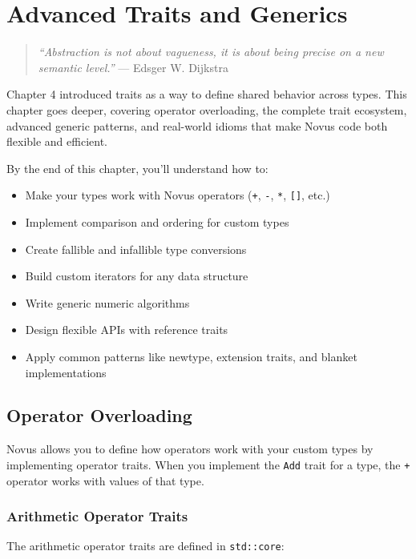 \chapter{Advanced Traits and Generics}
\label{ch:traits-generics}

\begin{quote}
\textit{``Abstraction is not about vagueness, it is about being precise on a new semantic level.''} --- Edsger W. Dijkstra
\end{quote}

Chapter 4 introduced traits as a way to define shared behavior across types. This chapter goes deeper, covering operator overloading, the complete trait ecosystem, advanced generic patterns, and real-world idioms that make Novus code both flexible and efficient.

By the end of this chapter, you'll understand how to:
\begin{itemize}
    \item Make your types work with Novus operators (\texttt{+}, \texttt{-}, \texttt{*}, \texttt{[]}, etc.)
    \item Implement comparison and ordering for custom types
    \item Create fallible and infallible type conversions
    \item Build custom iterators for any data structure
    \item Write generic numeric algorithms
    \item Design flexible APIs with reference traits
    \item Apply common patterns like newtype, extension traits, and blanket implementations
\end{itemize}

\section{Operator Overloading}
\label{sec:operator-overloading}

Novus allows you to define how operators work with your custom types by implementing operator traits. When you implement the \texttt{Add} trait for a type, the \texttt{+} operator works with values of that type.

\subsection{Arithmetic Operator Traits}

The arithmetic operator traits are defined in \texttt{std::core}:

